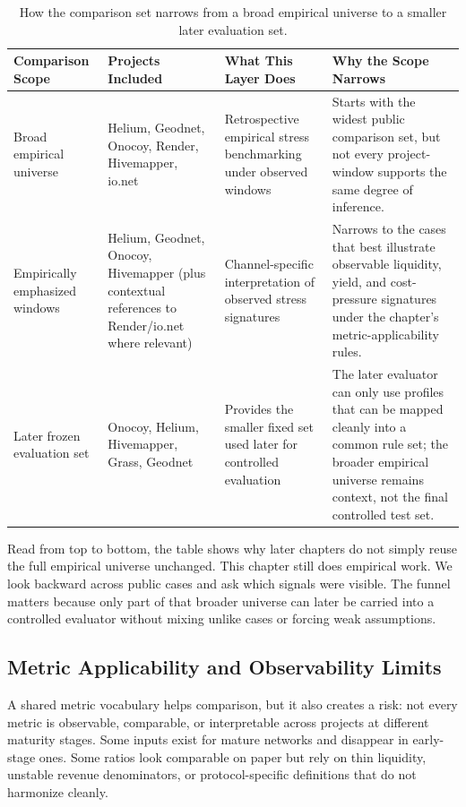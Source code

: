 \begin{table}[H]
    \centering
    \footnotesize
    \renewcommand{\arraystretch}{1.2}
    \setlength{\tabcolsep}{4pt}
    \begin{tabularx}{\textwidth}{@{}>{\raggedright\arraybackslash}p{}>{\raggedright\arraybackslash}p{}>{\raggedright\arraybackslash}p{}X@{}}
        \toprule
        \textbf{Comparison Scope} & \textbf{Projects Included} & \textbf{What This Layer Does} & \textbf{Why the Scope Narrows} \\
        \midrule
        Broad empirical universe &
        Helium, Geodnet, Onocoy, Render, Hivemapper, io.net &
        Retrospective empirical stress benchmarking under observed windows &
        Starts with the widest public comparison set, but not every project-window supports the same degree of inference. \\
        \addlinespace
        Empirically emphasized windows &
        Helium, Geodnet, Onocoy, Hivemapper (plus contextual references to Render/io.net where relevant) &
        Channel-specific interpretation of observed stress signatures &
        Narrows to the cases that best illustrate observable liquidity, yield, and cost-pressure signatures under the chapter's metric-applicability rules. \\
        \addlinespace
        Later frozen evaluation set &
        Onocoy, Helium, Hivemapper, Grass, Geodnet &
        Provides the smaller fixed set used later for controlled evaluation &
        The later evaluator can only use profiles that can be mapped cleanly into a common rule set; the broader empirical universe remains context, not the final controlled test set. \\
        \bottomrule
    \end{tabularx}
    \caption[Comparator lineage funnel]{How the comparison set narrows from a broad empirical universe to a smaller later evaluation set.}
    \label{tab:comparator_lineage_funnel}
\end{table}

Read from top to bottom, the table shows why later chapters do not simply reuse the full empirical universe unchanged. This chapter still does empirical work. We look backward across public cases and ask which signals were visible. The funnel matters because only part of that broader universe can later be carried into a controlled evaluator without mixing unlike cases or forcing weak assumptions.

\subsection{Metric Applicability and Observability Limits}
A shared metric vocabulary helps comparison, but it also creates a risk: not every metric is observable, comparable, or interpretable across projects at different maturity stages. Some inputs exist for mature networks and disappear in early-stage ones. Some ratios look comparable on paper but rely on thin liquidity, unstable revenue denominators, or protocol-specific definitions that do not harmonize cleanly.

